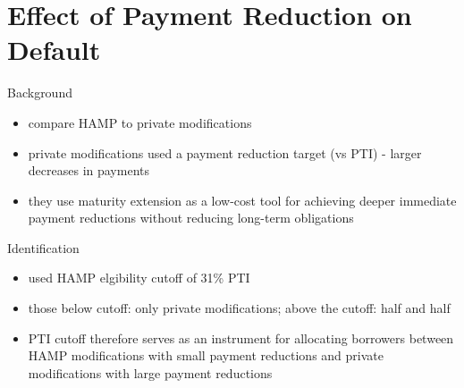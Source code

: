 \section{Effect of Payment Reduction on Default}

\begin{frame}{Background}
    \begin{itemize}
        \item compare HAMP to private modifications
        \item private modifications used a payment reduction target (vs PTI) - larger decreases in payments
        \item they use maturity extension as a low-cost tool for achieving deeper immediate payment reductions without reducing long-term obligations
        \begin{figure}
            \centering
            \hspace{1cm}
        \end{figure}
    \end{itemize}
\end{frame}

\begin{frame}{Identification}
    \begin{itemize}
        \item used HAMP elgibility cutoff of 31\% PTI
        \item those below cutoff: only private modifications; above the cutoff: half and half
        \item PTI cutoff therefore serves as an instrument for allocating borrowers between HAMP modifications with small payment reductions and private modifications with large payment reductions
    \end{itemize}
\end{frame}

